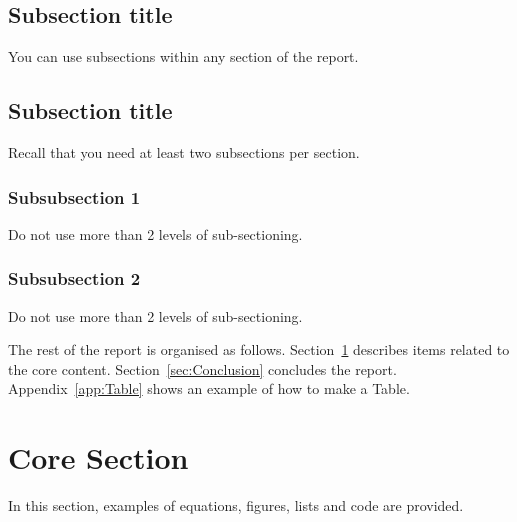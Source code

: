 \documentclass{UoNMCHA}
\numberwithin{equation}{section}
\begin{document}
\subsection{Subsection title}
You can use subsections within any section of the report. 
\subsection{Subsection title}
Recall that you need at least two subsections per section.
\subsubsection{Subsubsection 1}
Do not use more than 2 levels of sub-sectioning.
\subsubsection{Subsubsection 2}
Do not use more than 2 levels of sub-sectioning.

The rest of the report is organised as follows. Section~\ref{sec:Core Section} describes items related to the core content. Section~\ref{sec:Conclusion} concludes the report. Appendix~\ref{app:Table} shows an example of how to make a Table.

\newpage
\section{Core Section}\label{sec:Core Section}
In this section, examples of equations, figures, lists and code are provided.
\end{document}
